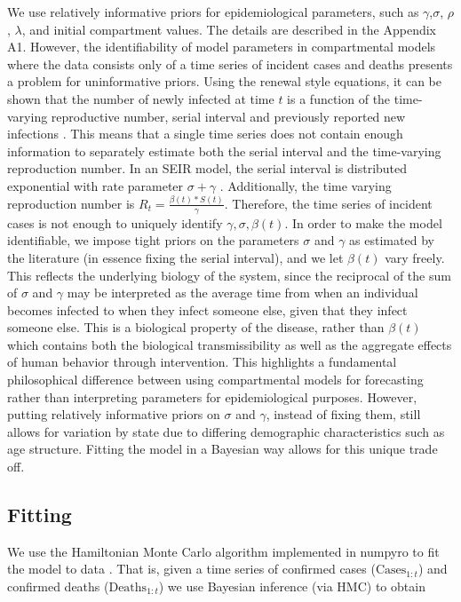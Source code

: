 \documentclass[11pt]{amsart}
\begin{document}
We use relatively informative priors for epidemiological parameters, such as $\gamma$,$\sigma$, $\rho$,  $\lambda$, and initial compartment values. The details are described in the Appendix A1. However, the identifiability of model parameters in compartmental models where the data consists only of a time series of incident cases and deaths presents a problem for uninformative priors. Using the renewal style equations, it can be shown that the number of newly infected at time $t$ is a function of the time-varying reproductive number, serial interval and previously reported new infections \cite{wallinga2007generation}. This means that a single time series does not contain enough information to separately estimate both the serial interval and the time-varying reproduction number. In an SEIR model, the serial interval is distributed exponential with rate parameter $\sigma + \gamma$ \cite{wallinga2007generation}. Additionally, the time varying reproduction number is $R_t = \frac{\beta(t)*S(t)}{\gamma}$. Therefore, the time series of incident cases is not enough to uniquely identify $\gamma,\sigma,\beta(t)$. In order to make the model identifiable, we impose tight priors on the parameters $\sigma$ and $\gamma$ as estimated by the literature (in essence fixing the serial interval), and we let $\beta(t)$ vary freely. This reflects the underlying biology of the system, since the reciprocal of the sum of $\sigma$ and $\gamma$ may be interpreted as the average time from when an individual becomes infected to when they infect someone else, given that they infect someone else. This is a biological property of the disease, rather than $\beta(t)$ which contains both the biological transmissibility as well as the aggregate effects of human behavior through intervention. This highlights a fundamental philosophical difference between using compartmental models for forecasting rather than interpreting parameters for epidemiological purposes. However, putting relatively informative priors on $\sigma$ and $\gamma$, instead of fixing them, still allows for variation by state due to differing demographic characteristics such as age structure. Fitting the model in a Bayesian way allows for this unique trade off.  

  \subsection{Fitting}
We use the Hamiltonian Monte Carlo algorithm implemented in numpyro to fit the model to data \cite{numpyro}. That is, given a time series of confirmed cases ($\text{Cases}_{1:t}$) and confirmed deaths ($\text{Deaths}_{1:t}$) we use Bayesian inference (via HMC) to obtain 
\end{document}
